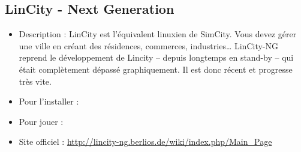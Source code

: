 \subsection{LinCity - Next Generation}
\begin{itemize}
\begingroup
{}
\item Description : LinCity est l'équivalent linuxien de SimCity. Vous devez gérer une ville en créant des résidences, commerces, industries\ldots{} LinCity-NG reprend le développement de Lincity -- depuis longtemps en stand-by -- qui était complètement dépassé graphiquement. Il est donc récent et progresse très vite.{\par}
\endgroup
\item Pour l'installer : 
\item Pour jouer : 
\item Site officiel : \url{http://lincity-ng.berlios.de/wiki/index.php/Main_Page}{\par}
\end{itemize}
\newpage%
